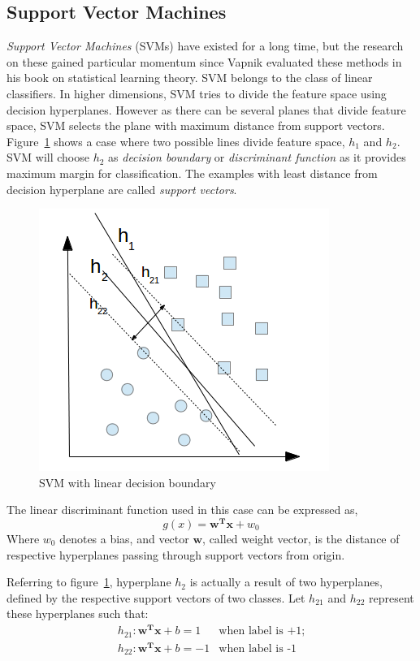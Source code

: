 \subsection{Support Vector Machines}
\label{mltypes:svm}
\emph{Support Vector Machines} (SVMs) have existed for a long time, but the research on these gained particular momentum since Vapnik \cite{Vapnik1995} evaluated these methods in his book on statistical learning theory. SVM belongs to the class of linear classifiers. In higher dimensions, SVM tries to divide the feature space using decision hyperplanes. However as there can be several planes that divide feature space, SVM selects the plane with maximum distance from support vectors. Figure~\ref{fig:svm1} shows a case where two possible lines divide feature space, $h_1$ and $h_2$. SVM will choose $h_2$ as \emph{decision boundary} or \emph{discriminant function} as it provides maximum margin for classification. The examples with least distance from decision hyperplane are called \emph{support vectors}.

\begin{figure}[h]
  \begin{center}
    \captionsetup{justification=centering}
    \includegraphics[scale=0.45]{figures/svm1.png}
    \caption{SVM with linear decision boundary}
    \label{fig:svm1}
  \end{center}
\end{figure}
The linear discriminant function used in this case can be expressed as,
\[g(x) = \boldsymbol{w^T}\boldsymbol{x} + w_0 \]
Where $w_0$ denotes a bias, and vector $\boldsymbol{w}$, called weight vector, is the distance of respective hyperplanes passing through support vectors from origin.

Referring to figure~\ref{fig:svm1}, hyperplane $h_2$ is actually a result of two hyperplanes, defined by the respective support vectors of two classes. Let $h_{21}$ and $h_{22}$ represent these hyperplanes	such that:
\[\begin{array}{ll} 
h_{21}: \boldsymbol{w^T}\boldsymbol{x} + b = 1 & \mbox{when label is +1};\\
h_{22}: \boldsymbol{w^T}\boldsymbol{x} + b = -1 & \mbox{when label is -1}
\end{array} \]

